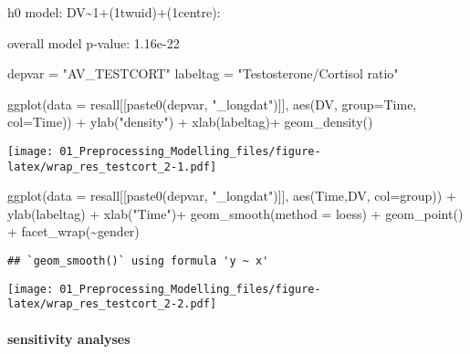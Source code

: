 \documentclass[
]{article}
\newenvironment{Shaded}{\begin{snugshade}}{\end{snugshade}}
\newcommand{\AttributeTok}[1]{\textcolor[rgb]{0.77,0.63,0.00}{#1}}
\newcommand{\FunctionTok}[1]{\textcolor[rgb]{0.00,0.00,0.00}{#1}}
\newcommand{\NormalTok}[1]{#1}
\newcommand{\OtherTok}[1]{\textcolor[rgb]{0.56,0.35,0.01}{#1}}
\newcommand{\SpecialCharTok}[1]{\textcolor[rgb]{0.00,0.00,0.00}{#1}}
\newcommand{\StringTok}[1]{\textcolor[rgb]{0.31,0.60,0.02}{#1}}
\begin{document}
h0 model: DV\textasciitilde1+(1\textbar twuid)+(1\textbar centre):

overall model p-value: 1.16e-22

\begin{Shaded}
\begin{Highlighting}[]
\NormalTok{depvar }\OtherTok{=} \StringTok{"AV\_TESTCORT"}
\NormalTok{labeltag }\OtherTok{=} \StringTok{"Testosterone/Cortisol ratio"}

\FunctionTok{ggplot}\NormalTok{(}\AttributeTok{data =}\NormalTok{ resall[[}\FunctionTok{paste0}\NormalTok{(depvar, }\StringTok{"\_longdat"}\NormalTok{)]], }
       \FunctionTok{aes}\NormalTok{(DV, }\AttributeTok{group=}\NormalTok{Time, }\AttributeTok{col=}\NormalTok{Time)) }\SpecialCharTok{+} 
  \FunctionTok{ylab}\NormalTok{(}\StringTok{"density"}\NormalTok{) }\SpecialCharTok{+} \FunctionTok{xlab}\NormalTok{(labeltag)}\SpecialCharTok{+}
  \FunctionTok{geom\_density}\NormalTok{()}
\end{Highlighting}
\end{Shaded}

\texttt{[image: 01\_Preprocessing\_Modelling\_files/figure-latex/wrap\_res\_testcort\_2-1.pdf]}

\begin{Shaded}
\begin{Highlighting}[]
\FunctionTok{ggplot}\NormalTok{(}\AttributeTok{data =}\NormalTok{ resall[[}\FunctionTok{paste0}\NormalTok{(depvar, }\StringTok{"\_longdat"}\NormalTok{)]], }
       \FunctionTok{aes}\NormalTok{(Time,DV, }\AttributeTok{col=}\NormalTok{group)) }\SpecialCharTok{+} 
  \FunctionTok{ylab}\NormalTok{(labeltag) }\SpecialCharTok{+} \FunctionTok{xlab}\NormalTok{(}\StringTok{"Time"}\NormalTok{)}\SpecialCharTok{+}
  \FunctionTok{geom\_smooth}\NormalTok{(}\AttributeTok{method =} \StringTok{\textquotesingle{}loess\textquotesingle{}}\NormalTok{) }\SpecialCharTok{+} \FunctionTok{geom\_point}\NormalTok{() }\SpecialCharTok{+}   \FunctionTok{facet\_wrap}\NormalTok{(}\SpecialCharTok{\textasciitilde{}}\NormalTok{gender)}
\end{Highlighting}
\end{Shaded}

\begin{verbatim}
## `geom_smooth()` using formula 'y ~ x'
\end{verbatim}

\texttt{[image: 01\_Preprocessing\_Modelling\_files/figure-latex/wrap\_res\_testcort\_2-2.pdf]}

\hypertarget{sensitivity-analyses-3}{%
\paragraph{sensitivity analyses}\label{sensitivity-analyses-3}}
\end{document}
